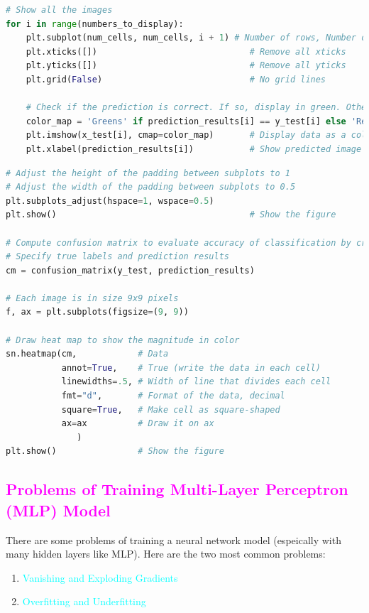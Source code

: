\documentclass{book}
\begin{document}
\begin{lstlisting}[language=Python, basicstyle=\ttfamily\small, keywordstyle=\color{blue}, commentstyle=\color{forestgreen}, stringstyle=\color{red}, showstringspaces=false]
# Show all the images
for i in range(numbers_to_display):    
    plt.subplot(num_cells, num_cells, i + 1) # Number of rows, Number of columns, Index (start from 1)
    plt.xticks([])                              # Remove all xticks
    plt.yticks([])                              # Remove all yticks
    plt.grid(False)                             # No grid lines

    # Check if the prediction is correct. If so, display in green. Otherwise in red.
    color_map = 'Greens' if prediction_results[i] == y_test[i] else 'Reds'
    plt.imshow(x_test[i], cmap=color_map)       # Display data as a color image
    plt.xlabel(prediction_results[i])           # Show predicted image labels
\end{lstlisting}
\newpage
\begin{lstlisting}[language=Python, basicstyle=\ttfamily\small, keywordstyle=\color{blue}, commentstyle=\color{forestgreen}, stringstyle=\color{red}, showstringspaces=false]
# Adjust the height of the padding between subplots to 1
# Adjust the width of the padding between subplots to 0.5
plt.subplots_adjust(hspace=1, wspace=0.5)
plt.show()                                      # Show the figure

# Compute confusion matrix to evaluate accuracy of classification by creating confusion_matrix object
# Specify true labels and prediction results
cm = confusion_matrix(y_test, prediction_results)

# Each image is in size 9x9 pixels
f, ax = plt.subplots(figsize=(9, 9))

# Draw heat map to show the magnitude in color
sn.heatmap(cm,            # Data
           annot=True,    # True (write the data in each cell)
           linewidths=.5, # Width of line that divides each cell
           fmt="d",       # Format of the data, decimal
           square=True,   # Make cell as square-shaped
           ax=ax          # Draw it on ax
              )
plt.show()                # Show the figure
\end{lstlisting}
\newpage
\textcolor{magenta}{\section{\textbf{Problems of Training Multi-Layer Perceptron (MLP) Model}}}
There are some problems of training a neural network model (espeically with many hidden layers like MLP).
Here are the two most common problems:
\begin{enumerate}
    \item \textcolor{cyan}{Vanishing and Exploding Gradients}
    \item \textcolor{cyan}{Overfitting and Underfitting}
\end{enumerate}
\end{document}
